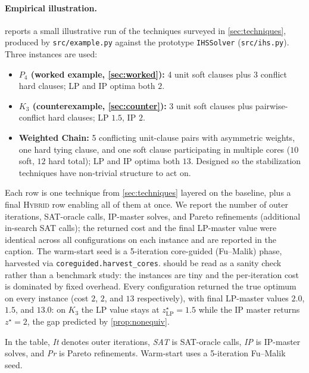 \paragraph{Empirical illustration.}  reports a small
illustrative run of the techniques surveyed in \cref{sec:techniques}, produced
by \texttt{src/example.py} against the prototype \texttt{IHSSolver}
(\texttt{src/ihs.py}). Three instances are used:
\begin{itemize}
\item \textbf{$P_4$ (worked example, \cref{sec:worked}):} 4 unit soft clauses
plus 3 conflict hard clauses; LP and IP optima both $2$.
\item \textbf{$K_3$ (counterexample, \cref{sec:counter}):} 3 unit soft clauses
plus pairwise-conflict hard clauses; LP $1.5$, IP $2$.
\item \textbf{Weighted Chain:} 5 conflicting unit-clause pairs with asymmetric
weights, one hard tying clause, and one soft clause participating in multiple
cores ($10$ soft, $12$ hard total); LP and IP optima both $13$. Designed so
the stabilization techniques have non-trivial structure to act on.
\end{itemize}
Each row is one technique from \cref{sec:techniques} layered on the baseline,
plus a final \textsc{Hybrid} row enabling all of them at once. We report the
number of outer iterations, SAT-oracle calls, IP-master solves, and Pareto
refinements (additional in-search SAT calls); the returned cost and the
final LP-master value were identical across all configurations on each
instance and are reported in the caption. The warm-start seed is a
5-iteration core-guided (Fu--Malik) phase, harvested via
\texttt{coreguided.harvest\_cores}.
 should be read as a sanity check rather than a benchmark
study: the instances are tiny and the per-iteration cost is dominated by
fixed overhead. Every configuration returned the true optimum on every instance 
(cost $2$, $2$, and $13$ respectively), with final LP-master values $2.0$, 
$1.5$, and $13.0$: on $K_3$ the LP value stays at $z^\star_{\mathrm{LP}} = 1.5$ 
while the IP master returns $z^\star = 2$, the gap predicted by \cref{prop:nonequiv}.

In the table, \textit{It} denotes outer iterations, \textit{SAT} is SAT-oracle calls, 
\textit{IP} is IP-master solves, and \textit{Pr} is Pareto refinements. Warm-start 
uses a 5-iteration Fu--Malik seed.

